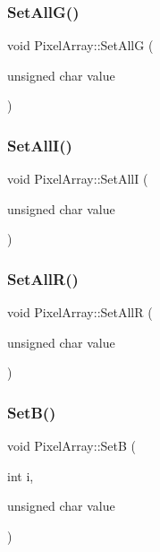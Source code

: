 \mbox{\label{class_pixel_array_a88f25ee1b266e2dc0ef7ae90ff4bd12d}} 
\subsubsection{\texorpdfstring{Set\+All\+G()}{SetAllG()}}
{\footnotesize\ttfamily void Pixel\+Array\+::\+Set\+AllG (\begin{DoxyParamCaption}\item[{unsigned char}]{value }\end{DoxyParamCaption})}

\mbox{\label{class_pixel_array_a9433e281c3cc0e4f8bbf23e127d8ad2c}} 
\subsubsection{\texorpdfstring{Set\+All\+I()}{SetAllI()}}
{\footnotesize\ttfamily void Pixel\+Array\+::\+Set\+AllI (\begin{DoxyParamCaption}\item[{unsigned char}]{value }\end{DoxyParamCaption})}

\mbox{\label{class_pixel_array_a9ddfdd1a01a9877e4bfcf5a462412fd2}} 
\subsubsection{\texorpdfstring{Set\+All\+R()}{SetAllR()}}
{\footnotesize\ttfamily void Pixel\+Array\+::\+Set\+AllR (\begin{DoxyParamCaption}\item[{unsigned char}]{value }\end{DoxyParamCaption})}

\mbox{\label{class_pixel_array_a560a654c59614fd5a6c17adb10083a78}} 
\subsubsection{\texorpdfstring{Set\+B()}{SetB()}}
{\footnotesize\ttfamily void Pixel\+Array\+::\+SetB (\begin{DoxyParamCaption}\item[{int}]{i,  }\item[{unsigned char}]{value }\end{DoxyParamCaption})}

